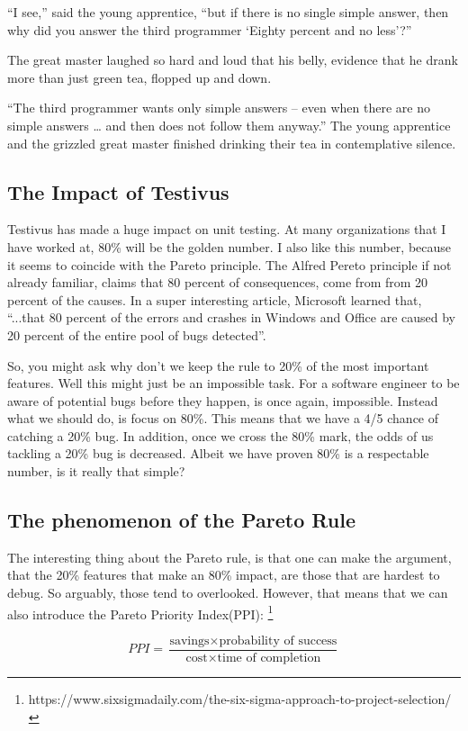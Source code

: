 {“I see,” said the young apprentice, “but if there is no single simple answer,
then why did you answer the third programmer ‘Eighty percent and no less’?”

The great master laughed so hard and loud that his belly, evidence that he
drank more than just green tea, flopped up and down.

“The third programmer wants only simple answers – even when there are no simple
answers … and then does not follow them anyway.” The young apprentice and the
grizzled great master finished drinking their tea in contemplative silence.
}

\subsection{The Impact of Testivus}
Testivus has made a huge impact on unit testing. At many organizations that I
have worked at, 80\% will be the golden number. I also like this number,
because it seems to coincide with the Pareto principle. The Alfred Pereto
principle if not already familiar, claims that 80 percent of consequences, come
from from 20 percent of the causes. In a super interesting article, Microsoft
learned that, ``...that 80 percent of the errors and crashes in Windows and
Office are caused by 20 percent of the entire pool of bugs detected''.

So, you might ask why don't we keep the rule to 20\% of the most important
features. Well this might just be an impossible task. For a software engineer
to be aware of potential bugs before they happen, is once again, impossible.
Instead what we should do, is focus on 80\%. This means that we have a 4/5
chance of catching a 20\% bug. In addition, once we cross the 80\% mark, the
odds of us tackling a 20\% bug is decreased. Albeit we have proven 80\% is a
respectable number, is it really that simple?

\subsection{The phenomenon of the Pareto Rule}
The interesting thing about the Pareto rule, is that one can make the argument,
that the 20\% features that make an 80\% impact, are those that are hardest to
debug. So arguably, those tend to overlooked. However, that means that we can
also introduce the Pareto Priority Index(PPI):
\footnote{https://www.sixsigmadaily.com/the-six-sigma-approach-to-project-selection/}

\[
PPI = \frac{\text{savings} \times \text{probability of success}}{\text{cost} \times \text{time of completion}}
\]


